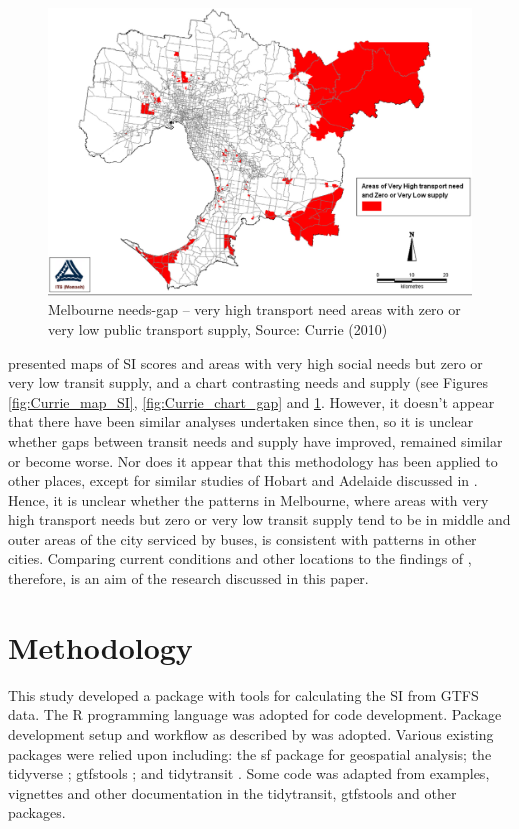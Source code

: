 \documentclass[preprint, 3p,
authoryear]{elsarticle} %
\begin{document}
\begin{figure}
\includegraphics[width=1\linewidth]{graphics/Currie2010gap} \caption{Melbourne needs-gap – very high transport need areas with zero or very low public transport supply, Source: Currie (2010)}\label{fig:Currie_map_gap}
\end{figure}

\citet{currie2010identifying} presented maps of SI scores and areas with
very high social needs but zero or very low transit supply, and a chart
contrasting needs and supply (see Figures \ref{fig:Currie_map_SI},
\ref{fig:Currie_chart_gap} and \ref{fig:Currie_map_gap}. However, it
doesn't appear that there have been similar analyses undertaken since
then, so it is unclear whether gaps between transit needs and supply
have improved, remained similar or become worse. Nor does it appear that
this methodology has been applied to other places, except for similar
studies of Hobart and Adelaide discussed in
\citet{currie2010identifying}. Hence, it is unclear whether the patterns
in Melbourne, where areas with very high transport needs but zero or
very low transit supply tend to be in middle and outer areas of the city
serviced by buses, is consistent with patterns in other cities.
Comparing current conditions and other locations to the findings of
\citet{currie2010identifying}, therefore, is an aim of the research
discussed in this paper.

\hypertarget{methodology}{%
\section{Methodology}\label{methodology}}

This study developed a package with tools for calculating the SI from
GTFS data. The R programming language \citep{R-base} was adopted for
code development. Package development setup and workflow as described by
\citet{wickham2023r} was adopted. Various existing packages were relied
upon including: the sf package \citep{R-sf} for geospatial analysis; the
tidyverse \citep{tidyverse2019}; gtfstools \citep{R-gtfstools}; and
tidytransit \citep{R-tidytransit}. Some code was adapted from examples,
vignettes and other documentation in the tidytransit, gtfstools and
other packages.
\end{document}
